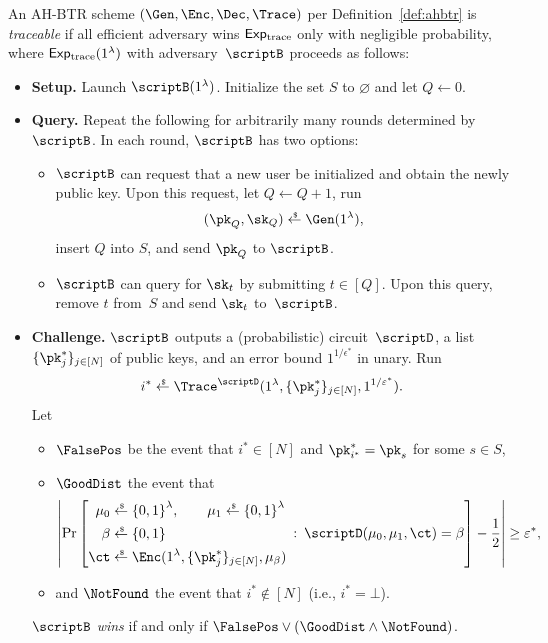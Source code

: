 \begin{definition}[traceability]\label{def:tracing-security}
An AH-BTR scheme $(\Gen,\Enc,\Dec,\Trace)$ per Definition~\ref{def:ahbtr} is \emph{traceable}
if all efficient adversary wins $\ExpTrace$ only with negligible probability,
where $\ExpTrace(1^\lambda)$ with adversary~$\scriptB$ proceeds as follows:
\begin{itemize}\upshape
\item\textbf{Setup.}
Launch $\scriptB(1^\lambda)$.
Initialize the set $S$ to $\varnothing$ and let ${Q\gets 0}$.
\item\textbf{Query.}
Repeat the following for arbitrarily many rounds determined by~$\scriptB$.
In each round, $\scriptB$ has two options:
\begin{itemize}
\item $\scriptB$ can request that a new user be initialized
and obtain the newly  public key.
Upon this request, let ${Q\gets Q+1}$, run
\begin{align*}
(\pk_Q,\sk_Q)\draws\Gen(1^\lambda),
\end{align*}
insert $Q$ into $S$, and send $\pk_Q$ to $\scriptB$.
\item $\scriptB$ can query for $\sk_t$ by submitting ${t\in[Q]}$.
Upon this query, remove $t$ from~$S$ and send $\sk_t$ to~$\scriptB$.
\end{itemize}
\item\textbf{Challenge.}
$\scriptB$ outputs a (probabilistic) circuit~$\scriptD$,
a list $\{\pk^\ast_j\}_{j\in[N]}$ of public keys, and
an error bound $1^{1/\epsilon^\ast}$ in unary.
Run
\begin{align*}
i^\ast\draws\Trace^\scriptD(1^\lambda,\{\pk^\ast_j\}_{j\in[N]},1^{1/\epsilon^\ast}).
\end{align*}
Let
\begin{itemize}
\item $\FalsePos$ be the event that ${i^\ast\in[N]}$ and ${\pk^\ast_{i^\ast}=\pk_s}$ for some ${s\in S}$,
\item $\GoodDist$ the event that
\begin{align*}
\left|\Pr\left[
\begin{aligned}
\mu_0&{}\draws\bit^\lambda,\qquad
\mu_1\draws\bit^\lambda\\
\beta&{}\draws\bit\\
\ct&{}\draws\Enc(1^\lambda,\{\pk^\ast_j\}_{j\in[N]},\mu_\beta)
\end{aligned}
\::\:
\scriptD(\mu_0,\mu_1,\ct)=\beta
\right]-\frac12
\right|
\geq\epsilon^\ast,
\end{align*}
\item and
$\NotFound$ the event that ${i^\ast\notin[N]}$ (i.e., ${i^\ast=\bot}$).
\end{itemize}
$\scriptB$ \emph{wins} if and only if ${\FalsePos\vee(\GoodDist\wedge\NotFound)}$.
\end{itemize}
\end{definition}


